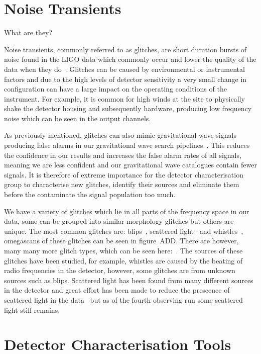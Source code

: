 \section{Noise Transients}

What are they?

Noise transients, commonly referred to as glitches, are short duration bursts of noise found in the LIGO data which commonly occur and lower the quality of the data when they do~\cite{LIGO_data_quality:2015}. Glitches can be caused by environmental or instrumental factors and due to the high levels of detector sensitivity a very small change in configuration can have a large impact on the operating conditions of the instrument. For example, it is common for high winds at the site to physically shake the detector housing and subsequently hardware, producing low frequency noise which can be seen in the output channels. 

As previously mentioned, glitches can also mimic gravitational wave signals producing false alarms in our gravitational wave search pipelines~\cite{GWMimicking:2010}. This reduces the confidence in our results and increases the false alarm rates of all signals, meaning we are less confident and our gravitational wave catalogues contain fewer signals. It is therefore of extreme importance for the detector characterisation group to characterise new glitches, identify their sources and eliminate them before the contaminate the signal population too much.

We have a variety of glitches which lie in all parts of the frequency space in our data, some can be grouped into similar morphology glitches but others are unique. The most common glitches are: blips~\cite{blips:2019}, scattered light~\cite{ArchEnemy:2023} and whistles~\cite{glitschen:2021}, omegascans of these glitches can be seen in figure~ADD. There are however, many many more glitch types, which can be seen here:~\cite{gravityspy:2017}. The sources of these glitches have been studied, for example, whistles are caused by the beating of radio frequencies in the detector, however, some glitches are from unknown sources such as blips. Scattered light has been found from many different sources in the detector and great effort has been made to reduce the prescence of scattered light in the data~\cite{reducing_scattering:2020} but as of the fourth observing run some scattered light still remains.
%
%
\section{Detector Characterisation Tools}

